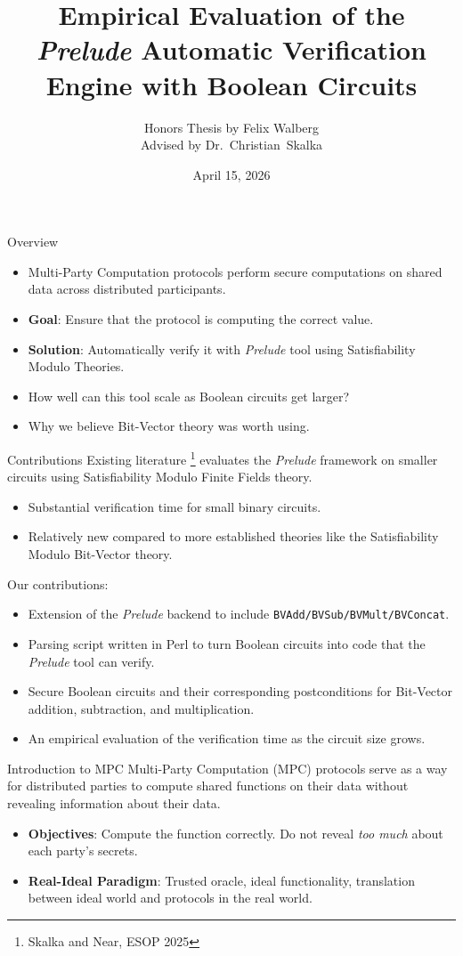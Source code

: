 \documentclass{beamer}
\title{Empirical Evaluation of the \textit{Prelude} Automatic Verification Engine with Boolean Circuits}
\author{Honors Thesis by Felix Walberg\\Advised by Dr.~Christian~Skalka}
\date{April 15, 2026}
\begin{document}
\begin{frame}
    \titlepage 
\end{frame}
\begin{frame}{Overview}
    \begin{itemize}
    \item Multi-Party Computation protocols perform secure computations on shared data across distributed participants.
    \item \textbf{Goal}: Ensure that the protocol is computing the correct value.
    \item \textbf{Solution}: Automatically verify it with \textit{Prelude} tool using Satisfiability Modulo Theories.
    \item How well can this tool scale as Boolean circuits get larger?
    \item Why we believe Bit-Vector theory was worth using.
    \end{itemize}
\end{frame}
\begin{frame}{Contributions}
    Existing literature \footnote{Skalka and Near, ESOP 2025} evaluates the \textit{Prelude} framework on smaller circuits using Satisfiability Modulo Finite Fields theory. 
    \begin{itemize}
        \item Substantial verification time for small binary circuits.
        \item Relatively new compared to more established theories like the Satisfiability Modulo Bit-Vector theory.
    \end{itemize}
    Our contributions:
    \begin{itemize}
        \item Extension of the \textit{Prelude} backend to include \texttt{BVAdd/BVSub/BVMult/BVConcat}.
        \item Parsing script written in Perl to turn Boolean circuits into code that the \textit{Prelude} tool can verify.
        \item Secure Boolean circuits and their corresponding postconditions for Bit-Vector addition, subtraction, and multiplication.
        \item An empirical evaluation of the verification time as the circuit size grows.
    \end{itemize}
\end{frame}
\begin{frame}{Introduction to MPC}
    Multi-Party Computation (MPC) protocols serve as a way for distributed parties to compute shared functions on their data without revealing information about their data.
    \begin{itemize}
    \item \textbf{Objectives}: Compute the function correctly. Do not reveal \textit{too much} about each party's secrets.
    \item \textbf{Real-Ideal Paradigm}: Trusted oracle, ideal functionality, translation between ideal world and protocols in the real world.
    \end{itemize}
\end{frame}
\end{document}
